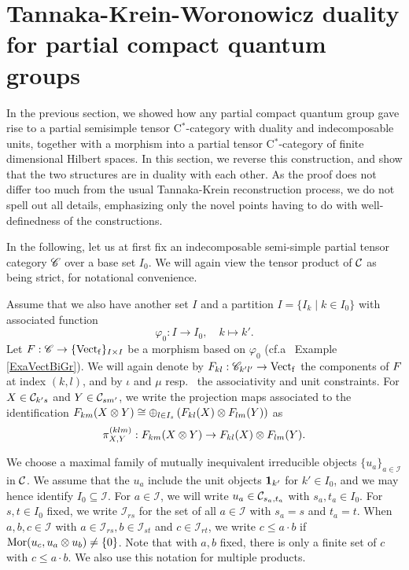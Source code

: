 \section{Tannaka-Krein-Woronowicz duality for partial compact quantum groups}


In the previous section, we showed how any partial compact quantum group gave rise to a partial semisimple tensor C$^*$-category with duality and indecomposable units, together with a morphism into a partial tensor C$^*$-category of finite dimensional Hilbert spaces. In this section, we reverse this construction, and show that the two structures are in duality with each other. As the proof does not differ too much from the usual Tannaka-Krein reconstruction process, we do not spell out all details, emphasizing only the novel points having to do with well-definedness of the constructions.  %

In the following, let us at first fix an indecomposable semi-simple partial tensor category $\mathscr{C}$ over a base set $I_0$. We will again view the tensor product of $\mathcal{C}$ as being strict, for notational convenience. 

Assume that we also have another set $I$ and a partition $I = \{I_k\mid k\in I_0\}$ with associated function \[\varphi_0:I\rightarrow I_0, \quad k\mapsto k'.\] Let $F: \mathscr{C}\rightarrow \{\mathrm{Vect}_{\operatorname{\mathrm{f}}}\}_{I\times I}$ be a morphism based on $\varphi_0$ (cf.a~ Example \ref{ExaVectBiGr}).  We will again denote by $F_{kl}:\mathscr{C}_{k'l'}\rightarrow \mathrm{Vect}_{\operatorname{\mathrm{f}}}$ the components of $F$ at index $(k,l)$, and by $\iota$ and $\mu$ resp.~ the associativity and unit constraints.  For $X\in \mathcal{C}_{k's}$ and $Y\in \mathcal{C}_{sm'}$, we write the projection maps associated to the identification $F_{km}(X\otimes Y)\cong \oplus_{l\in I_s} \left(F_{kl}(X)\otimes F_{lm}(Y)\right)$ as \[\pi^{(klm)}_{X,Y}:F_{km}(X\otimes Y) \rightarrow F_{kl}(X)\otimes F_{lm}(Y).\]

We choose a maximal family of mutually inequivalent irreducible objects $\{u_a\}_{a\in \mathcal{I}}$ in $\mathcal{C}$. We assume that the $u_a$ include the unit objects $\mathbf{1}_{k'}$ for $k'\in I_0$, and we may hence identify $I_0\subseteq \mathcal{I}$. For $a\in \mathcal{I}$, we will write $u_a \in \mathcal{C}_{s_a,t_a}$ with $s_a,t_a\in I_0$. For $s,t\in I_0$ fixed, we write $\mathcal{I}_{rs}$ for the set of all $a\in \mathcal{I}$ with $s_a=s$ and $t_a=t$. When $a,b,c\in \mathcal{I}$ with $a\in \mathcal{I}_{rs},b\in \mathcal{I}_{st}$ and $c\in \mathcal{I}_{rt}$, we write $c\leq a\cdot b$ if $\mathrm{Mor}(u_c,u_a\otimes u_b)\neq \{0\}$. Note that with $a,b$ fixed, there is only a finite set of $c$ with $c\leq a\cdot b$. We also use this notation for multiple products.

